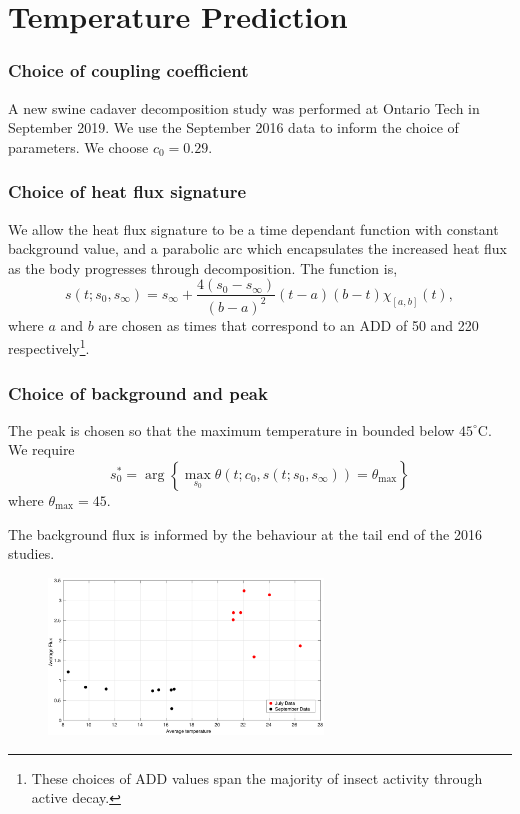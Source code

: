 \documentclass{beamer}
\begin{document}
\section{Temperature Prediction}
\begin{frame}
  \frametitle{Choice of coupling coefficient}
  A new swine cadaver decomposition study was performed at Ontario
  Tech in September 2019. We use the September 2016 data to inform the
  choice of parameters. We choose $c_0 = 0.29$.
\end{frame}

\begin{frame}
  \frametitle{Choice of heat flux signature}
  We allow the heat flux signature to be a time dependant function
  with constant background value, and a parabolic arc which
  encapsulates the increased heat flux as the body progresses through
  decomposition. The function is,
  \begin{equation}\label{eq:flux_function}
    s(t; s_0, s_\infty) = s_\infty + 
    \frac{4(s_0-s_\infty)}{(b-a)^2}(t-a)(b-t)\chi_{[a,b]}(t),
\end{equation}
  where $a$ and $b$ are chosen as times that correspond to an ADD of
  50 and 220 respectively\footnote{These choices of ADD values
    span the majority of insect activity through active decay.}.
\end{frame}

\begin{frame}
  \frametitle{Choice of background and peak}
  The peak is chosen so that the maximum temperature in bounded below
  $45^\circ$C. We require
  \begin{equation}
    s_0^* = \arg\left\{\max_{s_0} \theta\left(t; c_0, s\left(
    t;s_0, s_\infty\right)\right) = \theta_{\max}\right\}
\end{equation}
where $\theta_{\max} = 45$.

  The background flux is informed by the behaviour at the
  tail end of the 2016 studies.
  \begin{figure}
\includegraphics[width=0.65\textwidth]{Figures/flux_tail}
\label{fig:s-fun-ADD}
\end{figure}
\end{frame}
\end{document}
